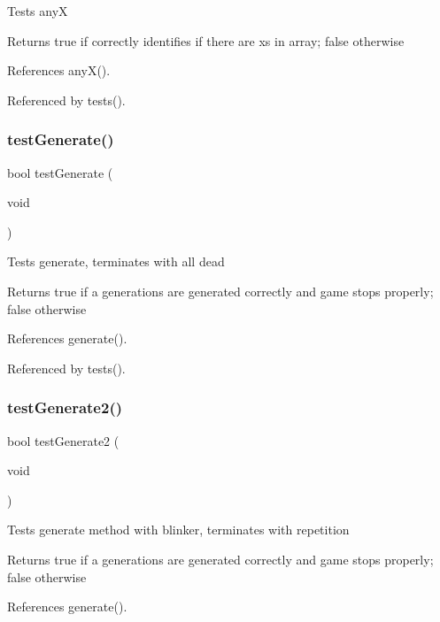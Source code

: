 Tests anyX \begin{DoxyReturn}{Returns}
true if correctly identifies if there are x\textquotesingle{}s in array; false otherwise 
\end{DoxyReturn}


References any\+X().



Referenced by tests().

\mbox{\label{tests_8h_a452bec98ef4419a18c4f15592208ee7b}} 
\subsubsection{test\+Generate()}
{\footnotesize\ttfamily bool test\+Generate (\begin{DoxyParamCaption}\item[{void}]{ }\end{DoxyParamCaption})}

Tests generate, terminates with all dead \begin{DoxyReturn}{Returns}
true if a generations are generated correctly and game stops properly; false otherwise 
\end{DoxyReturn}


References generate().



Referenced by tests().

\mbox{\label{tests_8h_a2b06f6173fe50a78583de1d41af922d5}} 
\subsubsection{test\+Generate2()}
{\footnotesize\ttfamily bool test\+Generate2 (\begin{DoxyParamCaption}\item[{void}]{ }\end{DoxyParamCaption})}

Tests generate method with blinker, terminates with repetition \begin{DoxyReturn}{Returns}
true if a generations are generated correctly and game stops properly; false otherwise 
\end{DoxyReturn}


References generate().



